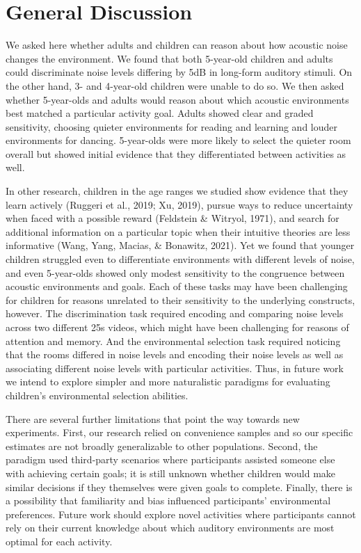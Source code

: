 \documentclass[10pt, letterpaper]{article}
\begin{document}
\hypertarget{general-discussion}{%
\section{General Discussion}\label{general-discussion}}

We asked here whether adults and children can reason about how acoustic
noise changes the environment. We found that both 5-year-old children
and adults could discriminate noise levels differing by 5dB in long-form
auditory stimuli. On the other hand, 3- and 4-year-old children were
unable to do so. We then asked whether 5-year-olds and adults would
reason about which acoustic environments best matched a particular
activity goal. Adults showed clear and graded sensitivity, choosing
quieter environments for reading and learning and louder environments
for dancing. 5-year-olds were more likely to select the quieter room
overall but showed initial evidence that they differentiated between
activities as well.

In other research, children in the age ranges we studied show evidence
that they learn actively (Ruggeri et al., 2019; Xu, 2019), pursue ways
to reduce uncertainty when faced with a possible reward (Feldstein \&
Witryol, 1971), and search for additional information on a particular
topic when their intuitive theories are less informative (Wang, Yang,
Macias, \& Bonawitz, 2021). Yet we found that younger children struggled
even to differentiate environments with different levels of noise, and
even 5-year-olds showed only modest sensitivity to the congruence
between acoustic environments and goals. Each of these tasks may have
been challenging for children for reasons unrelated to their sensitivity
to the underlying constructs, however. The discrimination task required
encoding and comparing noise levels across two different 25s videos,
which might have been challenging for reasons of attention and memory.
And the environmental selection task required noticing that the rooms
differed in noise levels and encoding their noise levels as well as
associating different noise levels with particular activities. Thus, in
future work we intend to explore simpler and more naturalistic paradigms
for evaluating children's environmental selection abilities.

There are several further limitations that point the way towards new
experiments. First, our research relied on convenience samples and so
our specific estimates are not broadly generalizable to other
populations. Second, the paradigm used third-party scenarios where
participants assisted someone else with achieving certain goals; it is
still unknown whether children would make similar decisions if they
themselves were given goals to complete. Finally, there is a possibility
that familiarity and bias influenced participants' environmental
preferences. Future work should explore novel activities where
participants cannot rely on their current knowledge about which auditory
environments are most optimal for each activity.
\end{document}
